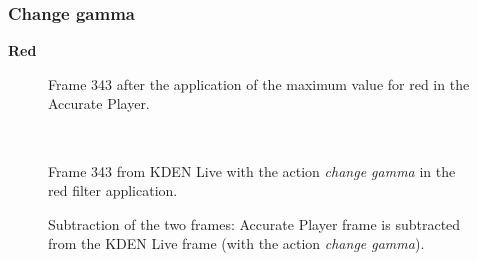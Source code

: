 \documentclass[../MasterThesis.tex]{subfiles}
\begin{document}
\subsubsection*{Change gamma}



\textbf{Red}

\vspace*{-1em}

\begin{minipage}{0.48\textwidth}
	\begin{figure}[H]
		\begin{center}
			\caption[Frame 343 after the application of the red filter in the Accurate Player.]{Frame 343 after the application of the maximum value for red in the Accurate Player.}
		\end{center}
	\end{figure}
\end{minipage}\begin{minipage}{0.04\textwidth}
	\ 
\end{minipage}\begin{minipage}{0.48\textwidth}
	\begin{figure}[H]
		\begin{center}
			\caption[Frame 343 from KDEN Live with the action \textit{change gamma}.]{Frame 343 from KDEN Live with the action \textit{change gamma} in the red filter application.}
		\end{center}
	\end{figure}
\end{minipage}

\vspace*{-1em}

\begin{figure}[H]
	\begin{center}
		\caption[Subtraction of KDEN Live (\textit{change gamma}) and Accurate Player.]{Subtraction of the two frames: Accurate Player frame is subtracted from the KDEN Live frame (with the action \textit{change gamma}).}
	\end{center}
\end{figure}






\vspace*{-1em}
\end{document}
